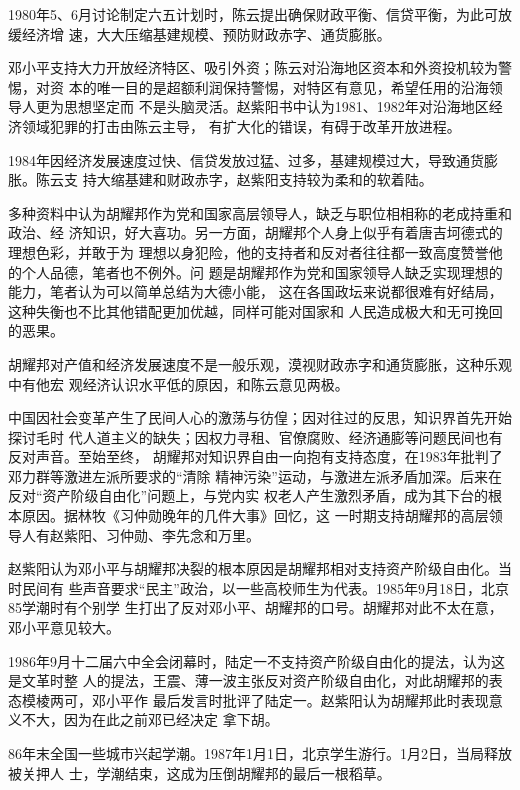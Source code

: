 
1980年5、6月讨论制定六五计划时，陈云提出确保财政平衡、信贷平衡，为此可放缓经济增
速，大大压缩基建规模、预防财政赤字、通货膨胀。

邓小平支持大力开放经济特区、吸引外资；陈云对沿海地区资本和外资投机较为警惕，对资
本的唯一目的是超额利润保持警惕，对特区有意见，希望任用的沿海领导人更为思想坚定而
不是头脑灵活。赵紫阳书中认为1981、1982年对沿海地区经济领域犯罪的打击由陈云主导，
有扩大化的错误，有碍于改革开放进程。

1984年因经济发展速度过快、信贷发放过猛、过多，基建规模过大，导致通货膨胀。陈云支
持大缩基建和财政赤字，赵紫阳支持较为柔和的软着陆。

多种资料中认为胡耀邦作为党和国家高层领导人，缺乏与职位相相称的老成持重和政治、经
济知识，好大喜功。另一方面，胡耀邦个人身上似乎有着唐吉坷德式的理想色彩，并敢于为
理想以身犯险，他的支持者和反对者往往都一致高度赞誉他的个人品德，笔者也不例外。问
题是胡耀邦作为党和国家领导人缺乏实现理想的能力，笔者认为可以简单总结为大德小能，
这在各国政坛来说都很难有好结局，这种失衡也不比其他错配更加优越，同样可能对国家和
人民造成极大和无可挽回的恶果。

胡耀邦对产值和经济发展速度不是一般乐观，漠视财政赤字和通货膨胀，这种乐观中有他宏
观经济认识水平低的原因，和陈云意见两极。

中国因社会变革产生了民间人心的激荡与彷偟；因对往过的反思，知识界首先开始探讨毛时
代人道主义的缺失；因权力寻租、官僚腐败、经济通膨等问题民间也有反对声音。至始至终，
胡耀邦对知识界自由一向抱有支持态度，在1983年批判了邓力群等激进左派所要求的“清除
精神污染”运动，与激进左派矛盾加深。后来在反对“资产阶级自由化”问题上，与党内实
权老人产生激烈矛盾，成为其下台的根本原因。据林牧《习仲勋晚年的几件大事》回忆，这
一时期支持胡耀邦的高层领导人有赵紫阳、习仲勋、李先念和万里。

赵紫阳认为邓小平与胡耀邦决裂的根本原因是胡耀邦相对支持资产阶级自由化。当时民间有
些声音要求“民主”政治，以一些高校师生为代表。1985年9月18日，北京85学潮时有个别学
生打出了反对邓小平、胡耀邦的口号。胡耀邦对此不太在意，邓小平意见较大。

1986年9月十二届六中全会闭幕时，陆定一不支持资产阶级自由化的提法，认为这是文革时整
人的提法，王震、薄一波主张反对资产阶级自由化，对此胡耀邦的表态模棱两可，邓小平作
最后发言时批评了陆定一。赵紫阳认为胡耀邦此时表现意义不大，因为在此之前邓已经决定
拿下胡。

86年末全国一些城市兴起学潮。1987年1月1日，北京学生游行。1月2日，当局释放被关押人
士，学潮结束，这成为压倒胡耀邦的最后一根稻草。

